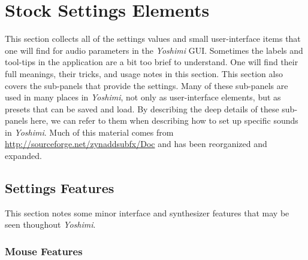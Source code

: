 %
%
%

\section{Stock Settings Elements}
\label{sec:stock_settings_elements}

   This section collects all of the settings values and small user-interface
   items that one will find for audio parameters in the \textsl{Yoshimi} GUI.
   Sometimes the labels and tool-tips in the application are a bit too brief to
   understand.  One will find their full meanings, their tricks, and usage
   notes in this section.
   This section also covers the sub-panels that provide the settings.
   Many of these sub-panels are used in many places in \textsl{Yoshimi},
   not only as user-interface elements, but as presets that can be saved and
   load.
   By describing the deep details of these sub-panels
   here, we can refer to them when
   describing how to set up specific sounds in
   \textsl{Yoshimi}.
   Much of this material comes from
   \url{http://sourceforge.net/zynaddsubfx/Doc}
   and has been reorganized and expanded.

\subsection{Settings Features}
\label{subsec:stock_settings_ui_features}

   This section notes some minor interface and synthesizer features that may
   be seen thoughout \textsl{Yoshimi}.

\subsubsection{Mouse Features}
\label{subsubsec:stock_settings_mouse_features}



